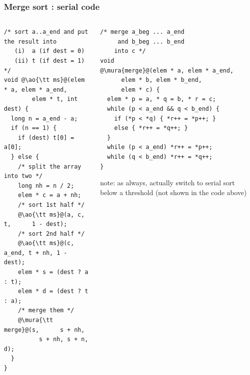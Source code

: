 \documentclass[12pt,dvipdfmx]{beamer}
\newcommand{\mura}[1]{{\color{purple}#1}}
\newcommand{\ao}[1]{{\color{blue}#1}}
\newcommand{\aka}[1]{{\color{red}#1}}
\begin{document}
\begin{frame}[fragile]
\frametitle{Merge sort : serial code}
\begin{columns}
\begin{column}{0.45\textwidth}
\begin{lstlisting}
/* sort a..a_end and put the result into
   (i)  a (if dest = 0)
   (ii) t (if dest = 1) */
void @\ao{\tt ms}@(elem * a, elem * a_end, 
        elem * t, int dest) {
  long n = a_end - a;
  if (n == 1) {
    if (dest) t[0] = a[0];
  } else {
    /* split the array into two */
    long nh = n / 2;
    elem * c = a + nh;
    /* sort 1st half */
    @\ao{\tt ms}@(a, c,     t,      1 - dest);
    /* sort 2nd half */
    @\ao{\tt ms}@(c, a_end, t + nh, 1 - dest);
    elem * s = (dest ? a : t);
    elem * d = (dest ? t : a);
    /* merge them */
    @\mura{\tt merge}@(s,      s + nh, 
          s + nh, s + n, d);
  }
}
\end{lstlisting}
\end{column}

\begin{column}{0.43\textwidth}
\begin{lstlisting}
/* merge a_beg ... a_end 
     and b_beg ... b_end 
    into c */
void 
@\mura{merge}@(elem * a, elem * a_end, 
      elem * b, elem * b_end, 
      elem * c) {
  elem * p = a, * q = b, * r = c;
  while (p < a_end && q < b_end) {
    if (*p < *q) { *r++ = *p++; }
    else { *r++ = *q++; }
  }
  while (p < a_end) *r++ = *p++;
  while (q < b_end) *r++ = *q++;
}
\end{lstlisting}

\aka{note:} as always, actually switch to serial sort below a threshold
  (not shown in the code above)
\end{column}
\end{columns}
\end{frame}
\end{document}
